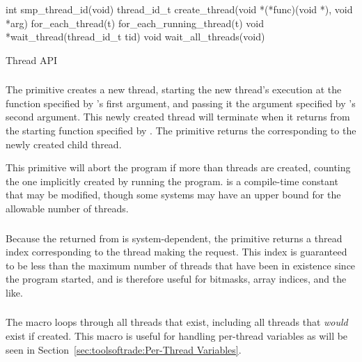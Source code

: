\begin{listing*}[tbp]
{ \scriptsize
\begin{verbbox}
int smp_thread_id(void)
thread_id_t create_thread(void *(*func)(void *), void *arg)
for_each_thread(t)
for_each_running_thread(t)
void *wait_thread(thread_id_t tid)
void wait_all_threads(void)
\end{verbbox}
}
\centering
\theverbbox
\caption{Thread API}
\label{lst:toolsoftrade:Thread API}
\end{listing*}

\subsubsection{}

The  primitive creates a new thread,
starting the new thread's execution
at the function  specified by 's
first argument, and passing it the argument specified by
's second argument.
This newly created thread will terminate when it returns from the
starting function specified by .
The  primitive returns the 
corresponding to the newly created child thread.

This primitive will abort the program if more than 
threads are created, counting the one implicitly created by running
the program.
 is a compile-time constant that may be modified,
though some systems may have an upper bound for the allowable number
of threads.

\subsubsection{}

Because the  returned from  is
system-dependent, the  primitive returns a thread
index corresponding to the thread making the request.
This index is guaranteed to be less than the maximum number of threads
that have been in existence since the program started,
and is therefore useful for bitmasks, array indices, and
the like.

\subsubsection{}

The  macro loops through all threads that exist,
including all threads that \emph{would} exist if created.
This macro is useful for handling per-thread variables as will be
seen in Section~\ref{sec:toolsoftrade:Per-Thread Variables}.

